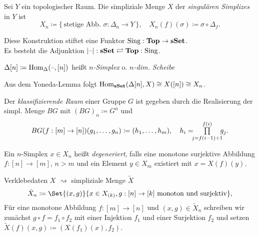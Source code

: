 \documentclass{cheat-sheet}
\newcommand{\nspace}[1]{\foreach \i in {1,...,#1}{ \! }} %
\DeclareMathOperator{\Sing}{Sing} %
\begin{document}
\begin{defn}
  Sei $Y$ ein topologischer Raum. Die simpliziale Menge $X$ der \emph{singulären Simplizes} in $Y$ ist
  \[
    X_n \coloneqq \{ \, \text{stetige Abb. } \sigma : \Delta_n \to Y \, \}, \quad
    X_n(f)(\sigma) \coloneqq \sigma \circ \Delta_f.
  \]
\end{defn}

\begin{bem}
  Diese Konstruktion stiftet eine Funktor $\Sing : \Top \to \sSet$. \\
  Es besteht die Adjunktion \enspace $\abs{\blank} : \sSet \rightleftarrows \Top : \Sing$.
\end{bem}

\begin{defn}
  $\Delta[n] \coloneqq \operatorname{Hom}_\Delta(\text{--}, [n])$ heißt \emph{$n$-Simplex} o. \emph{$n$-dim. Scheibe}
\end{defn}

\begin{bem}
  Aus dem Yoneda-Lemma folgt $\operatorname{Hom}_{\mathbf{sSet}}(\Delta[n], X) \cong X([n]) \cong X_n$.
\end{bem}

\begin{defn}
  Der \emph{klassifizierende Raum} einer Gruppe $G$ ist gegeben durch die Realisierung der simpl. Menge $BG$ mit $(BG)_n \coloneqq G^n$ und
  \begin{align*}
    BG(f : [m] \to [n])(g_1, \ldots, g_n) \coloneqq
    (h_1, \ldots, h_m), \quad h_i = \nspace{3} \prod_{j=f(i-1)+1}^{f(i)} \nspace{3} g_j.
  \end{align*}
\end{defn}

\begin{defn}
  Ein $n$-Simplex $x \in X_n$ heißt \emph{degeneriert}, falls eine monotone surjektive Abbildung $f : [n] \to [m]$, $n > m$ und ein Element $y \in X_m$ existiert mit $x = X(f)(y)$.
\end{defn}

\begin{konstr}
  Verklebedaten $X$ $\rightsquigarrow$ simpliziale Menge $\tilde{X}$
  \[ \tilde{X}_n \coloneqq \Set{ (x, g) }{ x \in X_{(k)}, g : [n] \to [k] \text{ monoton und surjektiv} }, \]
  Für eine monotone Abbildung $f : [m] \to [n]$ und $(x, g) \in \tilde{X}_n$ schreiben wir zunächst $g \circ f = f_1 \circ f_2$ mit einer Injektion $f_1$ und einer Surjektion $f_2$ und setzen
  $\tilde{X}(f)(x, g) \coloneqq (X(f_1)(x), f_2)$.
\end{konstr}
\end{document}
